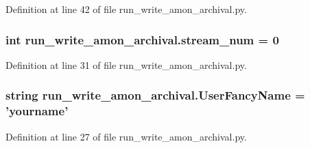 Definition at line 42 of file run\-\_\-write\-\_\-amon\-\_\-archival.\-py.

\hypertarget{namespacerun__write__amon__archival_a91764501aeed2509e7b7213785137320}{
\subsubsection[{stream\-\_\-num}]{\setlength{\rightskip}{0pt plus 5cm}int run\-\_\-write\-\_\-amon\-\_\-archival.\-stream\-\_\-num = 0}}\label{namespacerun__write__amon__archival_a91764501aeed2509e7b7213785137320}


Definition at line 31 of file run\-\_\-write\-\_\-amon\-\_\-archival.\-py.

\hypertarget{namespacerun__write__amon__archival_a840b590aab36a7b141e8c6fe6a27b963}{
\subsubsection[{User\-Fancy\-Name}]{\setlength{\rightskip}{0pt plus 5cm}string run\-\_\-write\-\_\-amon\-\_\-archival.\-User\-Fancy\-Name = 'yourname'}}\label{namespacerun__write__amon__archival_a840b590aab36a7b141e8c6fe6a27b963}


Definition at line 27 of file run\-\_\-write\-\_\-amon\-\_\-archival.\-py.


